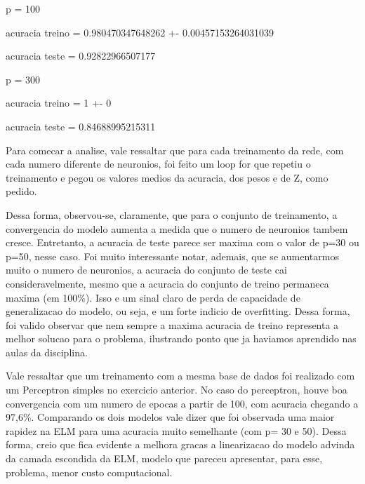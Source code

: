 \documentclass{article}
\begin{document}
p = 100 


\begin{Schunk}
\begin{Soutput}
acuracia treino = 0.980470347648262 +- 0.00457153264031039
\end{Soutput}
\begin{Soutput}
acuracia teste = 0.92822966507177
\end{Soutput}
\end{Schunk}

p = 300 


\begin{Schunk}
\begin{Soutput}
acuracia treino = 1 +- 0
\end{Soutput}
\begin{Soutput}
acuracia teste = 0.84688995215311
\end{Soutput}
\end{Schunk}

Para comecar a analise, vale ressaltar que para cada treinamento da rede, com cada numero diferente de neuronios, foi feito um loop for que repetiu o treinamento e pegou os valores medios da acuracia, dos pesos e de Z, como pedido. 

Dessa forma, observou-se, claramente, que para o conjunto de treinamento, a convergencia do modelo aumenta a medida que o numero de neuronios tambem cresce. Entretanto, a acuracia de teste parece ser maxima com o valor de p=30 ou p=50, nesse caso. Foi muito interessante notar, ademais, que se aumentarmos muito o numero de neuronios, a acuracia do conjunto de teste cai consideravelmente, mesmo que a acuracia do conjunto de treino permaneca maxima (em 100\%). Isso e um sinal claro de perda de capacidade de generalizacao do modelo, ou seja, e um forte indicio de overfitting. Dessa forma, foi valido observar que nem sempre a maxima acuracia de treino representa a melhor solucao para o problema, ilustrando ponto que ja haviamos aprendido nas aulas da disciplina. 

Vale ressaltar que um treinamento com a mesma base de dados foi realizado com um Perceptron simples no exercicio anterior. No caso do perceptron, houve boa convergencia com um numero de epocas a partir de 100, com acuracia chegando a 97,6\%. Comparando os dois modelos vale dizer que foi observada uma maior rapidez na ELM para uma acuracia muito semelhante (com p= 30 e 50). Dessa forma, creio que fica evidente a melhora gracas a linearizacao do modelo advinda da camada escondida da ELM, modelo que pareceu apresentar, para esse, problema, menor custo computacional.   
\end{document}
